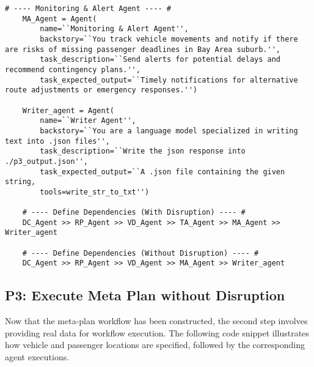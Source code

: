 \begin{lstlisting}[style=PythonStyle, caption=Collaborative Agents and Prompts, label=lst:agent_pipelinep3p4]
    # ---- Monitoring & Alert Agent ---- #
    MA_Agent = Agent(
        name=``Monitoring & Alert Agent'',
        backstory=``You track vehicle movements and notify if there are risks of missing passenger deadlines in Bay Area suburb.'',
        task_description=``Send alerts for potential delays and recommend contingency plans.'',
        task_expected_output=``Timely notifications for alternative route adjustments or emergency responses.'')
    
    Writer_agent = Agent(
        name=``Writer Agent'',
        backstory=``You are a language model specialized in writing text into .json files'',
        task_description=``Write the json response into ./p3_output.json'',
        task_expected_output=``A .json file containing the given string,
        tools=write_str_to_txt'')

    # ---- Define Dependencies (With Disruption) ---- #
    DC_Agent >> RP_Agent >> VD_Agent >> TA_Agent >> MA_Agent >> Writer_agent

    # ---- Define Dependencies (Without Disruption) ---- #
    DC_Agent >> RP_Agent >> VD_Agent >> MA_Agent >> Writer_agent

\end{lstlisting}

\subsection{P3: Execute Meta Plan without Disruption}

Now that the meta-plan workflow has been constructed, the second step involves providing real data for workflow execution. The following code snippet illustrates how vehicle and passenger locations are specified, followed by the corresponding agent executions.

